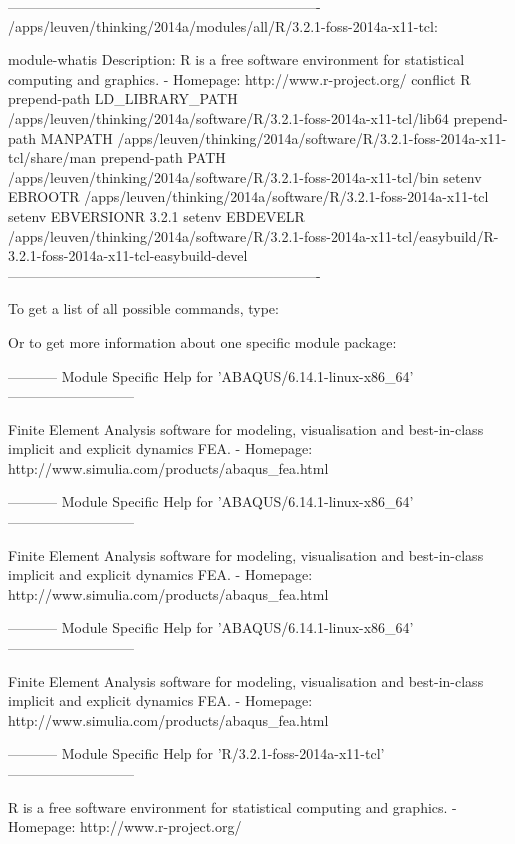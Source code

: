 \fi
\ifleuven
\begin{prompt}
-------------------------------------------------------------------
/apps/leuven/thinking/2014a/modules/all/R/3.2.1-foss-2014a-x11-tcl:

module-whatis    Description: R is a free software environment for statistical computing and graphics. - Homepage: http://www.r-project.org/
conflict         R
prepend-path     LD_LIBRARY_PATH /apps/leuven/thinking/2014a/software/R/3.2.1-foss-2014a-x11-tcl/lib64
prepend-path     MANPATH /apps/leuven/thinking/2014a/software/R/3.2.1-foss-2014a-x11-tcl/share/man
prepend-path     PATH /apps/leuven/thinking/2014a/software/R/3.2.1-foss-2014a-x11-tcl/bin
setenv           EBROOTR /apps/leuven/thinking/2014a/software/R/3.2.1-foss-2014a-x11-tcl
setenv           EBVERSIONR 3.2.1
setenv           EBDEVELR /apps/leuven/thinking/2014a/software/R/3.2.1-foss-2014a-x11-tcl/easybuild/R-3.2.1-foss-2014a-x11-tcl-easybuild-devel
-------------------------------------------------------------------
\end{prompt}
\fi


To get a list of all possible commands, type:

\begin{prompt}
\end{prompt}

Or to get more information about one specific module package:

\ifantwerpen
\begin{prompt}
----------- Module Specific Help for 'ABAQUS/6.14.1-linux-x86_64' ---------------------------

   Finite Element Analysis software for modeling, visualisation and best-in-class implicit and explicit dynamics FEA. - Homepage: http://www.simulia.com/products/abaqus_fea.html
\end{prompt}
\fi
\ifbrussel
\begin{prompt}
----------- Module Specific Help for 'ABAQUS/6.14.1-linux-x86_64' ---------------------------

   Finite Element Analysis software for modeling, visualisation and best-in-class implicit and explicit dynamics FEA. - Homepage: http://www.simulia.com/products/abaqus_fea.html
\end{prompt}
\fi
\ifgent
\begin{prompt}
----------- Module Specific Help for 'ABAQUS/6.14.1-linux-x86_64' ---------------------------

   Finite Element Analysis software for modeling, visualisation and best-in-class implicit and explicit dynamics FEA. - Homepage: http://www.simulia.com/products/abaqus_fea.html
\end{prompt}
\fi
\ifleuven
\begin{prompt}
----------- Module Specific Help for 'R/3.2.1-foss-2014a-x11-tcl' ---------------------------

   R is a free software environment for statistical computing and graphics. - Homepage: http://www.r-project.org/
\end{prompt}
\fi
